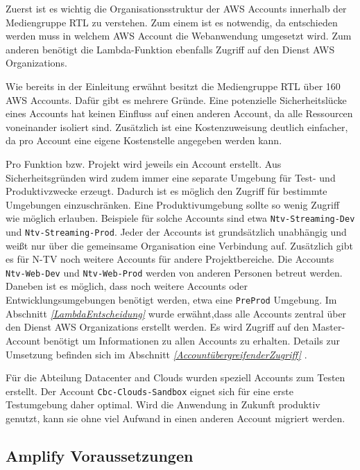 Zuerst ist es wichtig die Organisationsstruktur der AWS Accounts innerhalb der Mediengruppe RTL zu verstehen.
Zum einem ist es notwendig, da entschieden werden muss in welchem AWS Account die Webanwendung umgesetzt wird.
Zum anderen benötigt die Lambda-Funktion ebenfalls Zugriff auf den Dienst AWS Organizations.

Wie bereits in der Einleitung erwähnt besitzt die Mediengruppe RTL über 160 AWS Accounts.
Dafür gibt es mehrere Gründe.
Eine potenzielle Sicherheitslücke eines Accounts hat keinen Einfluss auf einen anderen Account, da alle Ressourcen voneinander isoliert sind.
Zusätzlich ist eine Kostenzuweisung deutlich einfacher, da pro Account eine eigene Kostenstelle angegeben werden kann.

Pro Funktion bzw. Projekt wird jeweils ein Account erstellt.
Aus Sicherheitsgründen wird zudem immer eine separate Umgebung für Test- und Produktivzwecke erzeugt.
Dadurch ist es möglich den Zugriff für bestimmte Umgebungen einzuschränken.
Eine Produktivumgebung sollte so wenig Zugriff wie möglich erlauben.
Beispiele für solche Accounts sind etwa \verb+Ntv-Streaming-Dev+ und \verb+Ntv-Streaming-Prod+.
Jeder der Accounts ist grundsätzlich unabhängig und weißt nur über die gemeinsame Organisation eine Verbindung auf.
Zusätzlich gibt es für N-TV noch weitere Accounts für andere Projektbereiche.
Die Accounts \verb+Ntv-Web-Dev+ und \verb+Ntv-Web-Prod+ werden von anderen Personen betreut werden.
Daneben ist es möglich, dass noch weitere Accounts oder Entwicklungsumgebungen benötigt werden, etwa eine \verb+PreProd+ Umgebung.
\clearpage
Im Abschnitt \textit{\ref{LambdaEntscheidung} } wurde erwähnt,dass alle Accounts zentral über den Dienst AWS Organizations erstellt werden.
Es wird Zugriff auf den Master-Account benötigt um Informationen zu allen Accounts zu erhalten.
Details zur Umsetzung befinden sich im Abschnitt \textit{\ref{AccountübergreifenderZugriff} }.

Für die Abteilung Datacenter and Clouds wurden speziell Accounts zum Testen erstellt.
Der Account \verb+Cbc-Clouds-Sandbox+ eignet sich für eine erste Testumgebung daher optimal.
Wird die Anwendung in Zukunft produktiv genutzt, kann sie ohne viel Aufwand in einen anderen Account migriert werden.
\newline

\subsection{Amplify Voraussetzungen}

